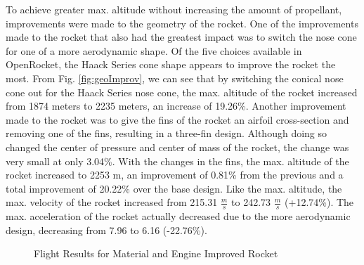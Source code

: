 \documentclass{report}
\begin{document}
\noindent To achieve greater max. altitude without increasing the amount of propellant, improvements were made to the geometry of the rocket.
One of the improvements made to the rocket that also had the greatest impact was to switch the nose cone for one of a more aerodynamic shape.
Of the five choices available in OpenRocket, the Haack Series cone shape appears to improve the rocket the most.
From Fig. \ref{fig:geoImprov}, we can see that by switching the conical nose cone out for the Haack Series nose cone, the max. altitude of the rocket increased from 1874 meters to 2235 meters, an increase of 19.26\%.
Another improvement made to the rocket was to give the fins of the rocket an airfoil cross-section and removing one of the fins, resulting in a three-fin design.
Although doing so changed the center of pressure and center of mass of the rocket, the change was very small at only 3.04\%.
With the changes in the fins, the max. altitude of the rocket increased to 2253 m, an improvement of 0.81\% from the previous and a total improvement of 20.22\% over the base design.
Like the max. altitude, the max. velocity of the rocket increased from 215.31 $\frac{m}{s}$ to 242.73 $\frac{m}{s}$ (+12.74\%).
The max. acceleration of the rocket actually decreased due to the more aerodynamic design, decreasing from 7.96 to 6.16 (-22.76\%).\\

\begin{figure}[h!]
    \centering
    \caption{Flight Results for Material and Engine Improved Rocket}
    \label{fig:improv2}
\end{figure}
\end{document}
